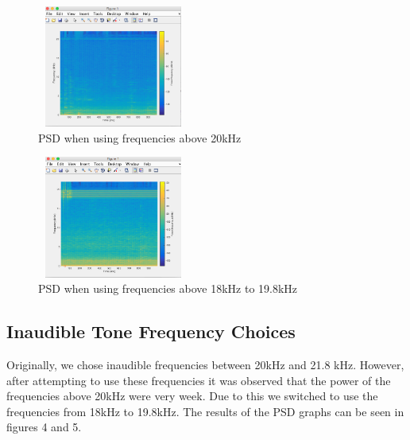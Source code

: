 \documentclass{acm_proc_article-sp}
\begin{document}
\begin{figure}[!htb]
\caption{PSD when using frequencies above 20kHz}
\center
\includegraphics[width=5cm, height=4cm]{above20}
\end{figure}

\begin{figure}[!htb]
\caption{PSD when using frequencies above 18kHz to 19.8kHz}
\center
\includegraphics[width=5cm, height=4cm]{Below20}
\end{figure}

\subsection{Inaudible Tone Frequency Choices}
Originally, we chose inaudible frequencies between 20kHz and 21.8 kHz. However, after attempting to use these frequencies it was observed that the power of the frequencies above 20kHz were very week. Due to this we switched to use the frequencies from 18kHz to 19.8kHz. The results of the PSD graphs can be seen in figures 4 and 5.
\end{document}
